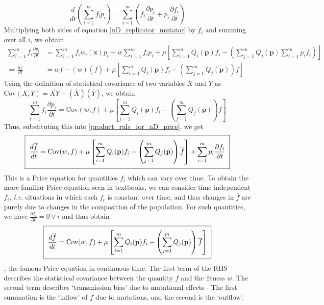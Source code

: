 \begin{equation}
\label{product_rule_for_nD_price}
\frac{d}{dt}\left(\sum\limits_{i=1}^{m}f_ip_i\right) = \sum\limits_{i=1}^{m}\left(f_i\frac{\partial p_i}{\partial t} + p_i\frac{\partial f_i}{\partial t}\right)
\end{equation}
Multiplying both sides of equation \eqref{nD_replicator_mutator} by $f_i$ and summing over all $i$, we obtain
\begin{align*}
\sum\limits_{i=1}^{m}f_i\frac{\partial p_i}{\partial t} &= \sum\limits_{i=1}^{m}f_iw_i(\mathbf{x})p_i - \overline{w}\sum\limits_{i=1}^{m}f_ip_i + \mu\left[\sum\limits_{i=1}^{m}Q_i(\mathbf{p})f_i - \left(\sum\limits_{j=1}^{m}Q_j(\mathbf{p})\sum\limits_{i=1}^{m}p_if_i\right)\right]\\
\Rightarrow \frac{d\overline{f}}{dt} &= \overline{wf}-(\overline{w})(\overline{f}) + \mu\left[\sum\limits_{i=1}^{m}Q_i(\mathbf{p})f_i - \left(\sum\limits_{j=1}^{m}Q_j(\mathbf{p})\right)\overline{f}\right]
\end{align*}
Using the definition of statistical covariance of two variables $X$ and $Y$ as $\mathrm{Cov}(X,Y) = \overline{XY} - (\overline{X})(\overline{Y})$, we obtain
\begin{equation}
\sum\limits_{i=1}^{m}f_i\frac{\partial p_i}{\partial t} = \mathrm{Cov}(w,f) + \mu\left[\sum\limits_{i=1}^{m}Q_i(\mathbf{p})f_i - \left(\sum\limits_{j=1}^{m}Q_j(\mathbf{p})\right)\overline{f}\right] 
\end{equation}
Thus, substituting this into \eqref{product_rule_for_nD_price}, we get
\begin{equation}
\label{nD_Price_time_dependent}
\setlength{\fboxsep}{2\fboxsep}\boxed{\frac{d\overline{f}}{dt} = \mathrm{Cov}(w,f) + \mu\left[\sum\limits_{i=1}^{m}Q_i(\mathbf{p})f_i - \left(\sum\limits_{j=1}^{m}Q_j(\mathbf{p})\right)\overline{f}\right] + \sum\limits_{i=1}^{m}p_i\frac{\partial f_i}{\partial t}}
\end{equation}
This is a Price equation for quantities $f_i$ which can vary over time. To obtain the more familiar Price equation seen in textbooks, we can consider time-independent $f_i$, \emph{i.e.} situations in which each $f_i$ is constant over time, and thus changes in $\overline{f}$ are purely due to changes in the composition of the population. For such quantities, we have $\frac{\partial f_i}{\partial t} = 0 \ \forall \ i$ and thus obtain 
\begin{equation}
\label{nD_Price}
\setlength{\fboxsep}{2\fboxsep}\boxed{
	\frac{d\overline{f}}{dt} = \mathrm{Cov}(w,f) + \mu\left[\sum\limits_{i=1}^{m}Q_i(\mathbf{p})f_i - \left(\sum\limits_{j=1}^{m}Q_j(\mathbf{p})\right)\overline{f}\right]}
\end{equation}
, the famous Price equation in continuous time. The first term of the RHS describes the statistical covariance between the quantity $f$ and the fitness $w$. The second term describes `transmission bias' due to mutational effects - The first summation is the `inflow' of $f$ due to mutations, and the second is the `outflow'.


